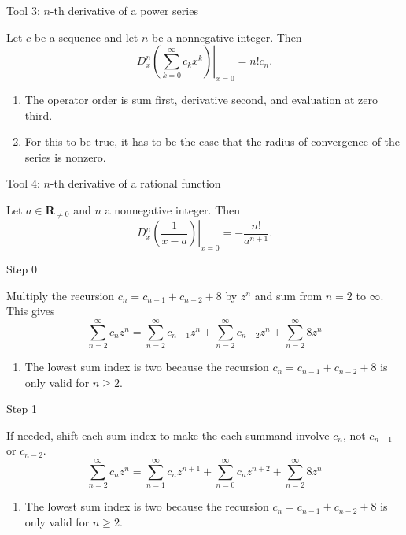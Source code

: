 \documentclass[portrait,fleqn,12pt]{beamer}
\newcommand{\reals}{\mathbf{R}}
\newenvironment{handlist}
   {\begin{enumerate}[\faHandPointRight]
       \addtolength{\itemsep}{0.0\itemsep}}
     {\end{enumerate}}
\begin{document}
\begin{frame}{Tool 3:  $n$-th derivative of a power series}

Let $c$ be a sequence and let $n$ be a nonnegative integer.  Then
\begin{equation}
      \left.  D^n_x \left( \sum_{k=0}^\infty c_k x^k  \right)  \right \vert_{x=0} = n!  c_n.
\end{equation}
\begin{handlist}
 \item The operator order is sum first, derivative second, and  evaluation at zero third.
   \item For this to be true, it has to be the case that  the radius of convergence of the series is nonzero.
\end{handlist}
\end{frame}

\begin{frame}{Tool 4:   $n$-th derivative of a rational function}

Let $a \in \reals_{\neq 0} $ and $n$ a nonnegative integer. Then
\begin{equation}
      \left.  D^n_x \left(\frac{1}{x-a}  \right) \right \vert_{x=0} = -\frac{n!}{a^{n+1}}.
\end{equation}
\end{frame}

\begin{frame}{Step 0}

Multiply the recursion $c_n = c_{n-1} + c_{n-2}+ 8$ by $z^n$ and sum from $n=2$ to $\infty$.  This gives
\begin{equation}
  \sum_{n=2}^\infty c_{n} z^n  =  \sum_{n=2}^\infty c_{n-1} z^n +  \sum_{n=2}^\infty c_{n-2} z^n +  \sum_{n=2}^\infty 8 z^n
\end{equation}
\begin{handlist}
\item The lowest sum index is two because the recursion  $c_n = c_{n-1} + c_{n-2}+ 8$ is only valid for $n \geq 2$.
\end{handlist}
\end{frame}
\begin{frame}{Step 1}

If needed, shift each sum index to make the each summand involve $c_n$, not $c_{n-1}$ or $c_{n-2}$.
\begin{equation}
  \sum_{n=2}^\infty c_{n} z^n  =  \sum_{n=1}^\infty c_{n} z^{n+1} +  \sum_{n=0}^\infty c_{n} z^{n+2} +  \sum_{n=2}^\infty 8 z^n
\end{equation}
\begin{handlist}
\item The lowest sum index is two because the recursion  $c_n = c_{n-1} + c_{n-2}+ 8$ is only valid for $n \geq 2$.
\end{handlist}
\end{frame}
\end{document}
